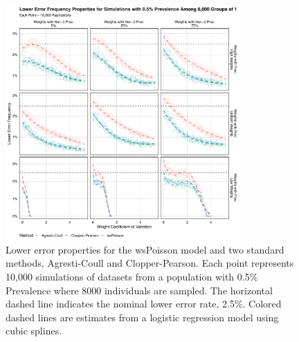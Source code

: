 \documentclass[AMA,STIX1COL]{WileyNJD-v2}
\begin{document}
\begin{figure}
\centering
\includegraphics[width=0.8\textwidth]{figures/perfect_lower_error_frequency_8000_groups_0_005_prev.pdf}
\caption{Lower error properties for the wsPoisson model and two standard methods, Agresti-Coull and Clopper-Pearson.
Each point represents 10,000 simulations of datasets from a population with 0.5\% Prevalence where 8000 individuals are sampled.
The horizontal dashed line indicates the nominal lower error rate, 2.5\%.
Colored dashed lines are estimates from a logistic regression model using cubic splines.}
\label{fig:perfect_lower_error_frequency_8000_groups_0_005_prev}
\end{figure}
\end{document}

